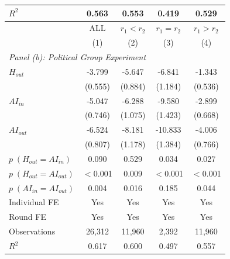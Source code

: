 \begin{table}[H]
\begin{threeparttable}
\begin{tabular}{l*{4}{c}}
$R^2$       &       0.563         &       0.553         &       0.419         &       0.529         \\
\midrule\midrule
 & ALL & $r_1 < r_2$ & $r_1 = r_2$ & $r_1 > r_2$ \\
 & (1) & (2) & (3) & (4) \\
\midrule
\multicolumn{5}{l}{\textit{Panel (b): Political Group Experiment}} \\
$H_{out}$   &      -3.799\sym{***}&      -5.647\sym{***}&      -6.841\sym{***}&      -1.343\sym{**} \\
            &     (0.555)         &     (0.884)         &     (1.184)         &     (0.536)         \\
\addlinespace
$AI_{in}$   &      -5.047\sym{***}&      -6.288\sym{***}&      -9.580\sym{***}&      -2.899\sym{***}\\
            &     (0.746)         &     (1.075)         &     (1.423)         &     (0.668)         \\
\addlinespace
$AI_{out}$  &      -6.524\sym{***}&      -8.181\sym{***}&     -10.833\sym{***}&      -4.006\sym{***}\\
            &     (0.807)         &     (1.178)         &     (1.384)         &     (0.766)         \\
\midrule
$p\;(H_{out} = AI_{in})$&       0.090         &       0.529         &       0.034         &       0.027         \\
$p\;(H_{out} = AI_{out})$&    $<$0.001         &       0.009         &    $<$0.001         &    $<$0.001         \\
$p\;(AI_{in} = AI_{out})$&       0.004         &       0.016         &       0.185         &       0.044         \\
Individual FE&         Yes         &         Yes         &         Yes         &         Yes         \\
Round FE    &         Yes         &         Yes         &         Yes         &         Yes         \\
Observations&      26,312         &      11,960         &       2,392         &      11,960         \\
$R^2$       &       0.617         &       0.600         &       0.497         &       0.557         \\
\bottomrule\bottomrule
\end{tabular}
\end{threeparttable}
\end{table}
